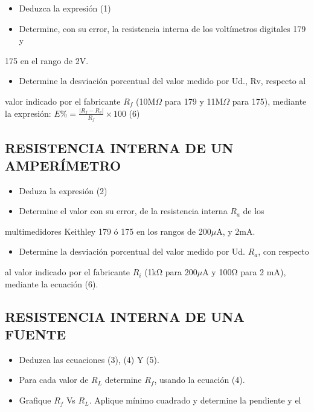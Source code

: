 \documentclass[11pt,a4paper]{article}
\begin{document}
\begin{itemize}[leftmargin=1.4em,itemsep=2pt,topsep=3pt]
  \item Deduzca la expresión (1)
  \item Determine, con su error, la resistencia interna de los voltímetros digitales 179 y
\end{itemize}

175 en el rango de 2V.

\begin{itemize}[leftmargin=1.4em,itemsep=2pt,topsep=3pt]
  \item Determine la desviación porcentual del valor medido por Ud., Rv, respecto al
\end{itemize}

valor indicado por el fabricante $R_f$ (10M$\Omega$ para 179 y 11M$\Omega$ para 175), mediante la expresión: $E\% = \frac{|R_f - R_v|}{R_f} \times 100$ (6)

\subsection*{RESISTENCIA INTERNA DE UN AMPERÍMETRO}

\begin{itemize}[leftmargin=1.4em,itemsep=2pt,topsep=3pt]
  \item Deduza la expresión (2)
  \item Determine el valor con su error, de la resistencia interna $R_a$ de los
\end{itemize}

multimedidores Keithley 179 ó 175 en los rangos de 200$\mu$A, y 2mA.

\begin{itemize}[leftmargin=1.4em,itemsep=2pt,topsep=3pt]
  \item Determine la desviación porcentual del valor medido por Ud. $R_a$, con respecto
\end{itemize}

al valor indicado por el fabricante $R_i$ (1kΩ para 200$\mu$A y 100Ω para 2 mA), mediante la ecuación (6).

\subsection*{RESISTENCIA INTERNA DE UNA FUENTE}

\begin{itemize}[leftmargin=1.4em,itemsep=2pt,topsep=3pt]
  \item Deduzca las ecuaciones (3), (4) Y (5).
  \item Para cada valor de $R_L$ determine $R_f$, usando la ecuación (4).
  \item Grafique $R_f$ Vs $R_L$. Aplique mínimo cuadrado y determine la pendiente y el
\end{itemize}
\end{document}
